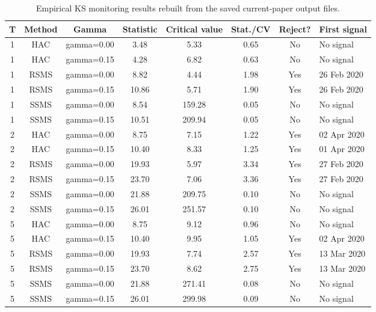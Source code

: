 \begin{table}[htbp]
\centering
\scriptsize
\caption{Empirical KS monitoring results rebuilt from the saved current-paper output files.}
\label{tab:bundle-empirical-main-ks}
\begin{tabular}{cccccccl}
\toprule
T & Method & Gamma & Statistic & Critical value & Stat./CV & Reject? & First signal \\
\midrule
1 & HAC & gamma=0.00 & 3.48 & 5.33 & 0.65 & No & No signal \\
1 & HAC & gamma=0.15 & 4.28 & 6.82 & 0.63 & No & No signal \\
1 & RSMS & gamma=0.00 & 8.82 & 4.44 & 1.98 & Yes & 26 Feb 2020 \\
1 & RSMS & gamma=0.15 & 10.86 & 5.71 & 1.90 & Yes & 26 Feb 2020 \\
1 & SSMS & gamma=0.00 & 8.54 & 159.28 & 0.05 & No & No signal \\
1 & SSMS & gamma=0.15 & 10.51 & 209.94 & 0.05 & No & No signal \\
2 & HAC & gamma=0.00 & 8.75 & 7.15 & 1.22 & Yes & 02 Apr 2020 \\
2 & HAC & gamma=0.15 & 10.40 & 8.33 & 1.25 & Yes & 01 Apr 2020 \\
2 & RSMS & gamma=0.00 & 19.93 & 5.97 & 3.34 & Yes & 27 Feb 2020 \\
2 & RSMS & gamma=0.15 & 23.70 & 7.06 & 3.36 & Yes & 27 Feb 2020 \\
2 & SSMS & gamma=0.00 & 21.88 & 209.75 & 0.10 & No & No signal \\
2 & SSMS & gamma=0.15 & 26.01 & 251.57 & 0.10 & No & No signal \\
5 & HAC & gamma=0.00 & 8.75 & 9.12 & 0.96 & No & No signal \\
5 & HAC & gamma=0.15 & 10.40 & 9.95 & 1.05 & Yes & 02 Apr 2020 \\
5 & RSMS & gamma=0.00 & 19.93 & 7.74 & 2.57 & Yes & 13 Mar 2020 \\
5 & RSMS & gamma=0.15 & 23.70 & 8.62 & 2.75 & Yes & 13 Mar 2020 \\
5 & SSMS & gamma=0.00 & 21.88 & 271.41 & 0.08 & No & No signal \\
5 & SSMS & gamma=0.15 & 26.01 & 299.98 & 0.09 & No & No signal \\
\bottomrule
\end{tabular}
\end{table}
